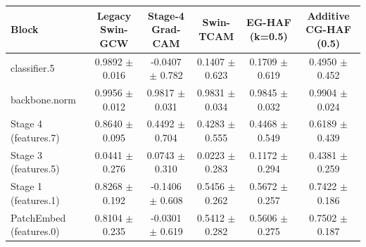 \begin{tabular}{lccccc}
\toprule
Block & Legacy Swin-GCW & Stage-4 Grad-CAM & Swin-TCAM & EG-HAF (k=0.5) & Additive CG-HAF (0.5) \\
\midrule
classifier.5 & 0.9892 $\pm$ 0.016 & -0.0407 $\pm$ 0.782 & 0.1407 $\pm$ 0.623 & 0.1709 $\pm$ 0.619 & 0.4950 $\pm$ 0.452 \\
backbone.norm & 0.9956 $\pm$ 0.012 & 0.9817 $\pm$ 0.031 & 0.9831 $\pm$ 0.034 & 0.9845 $\pm$ 0.032 & 0.9904 $\pm$ 0.024 \\
Stage 4 (features.7) & 0.8640 $\pm$ 0.095 & 0.4492 $\pm$ 0.704 & 0.4283 $\pm$ 0.555 & 0.4468 $\pm$ 0.549 & 0.6189 $\pm$ 0.439 \\
Stage 3 (features.5) & 0.0441 $\pm$ 0.276 & 0.0743 $\pm$ 0.310 & 0.0223 $\pm$ 0.283 & 0.1172 $\pm$ 0.294 & 0.4381 $\pm$ 0.259 \\
Stage 1 (features.1) & 0.8268 $\pm$ 0.192 & -0.1406 $\pm$ 0.608 & 0.5456 $\pm$ 0.262 & 0.5672 $\pm$ 0.257 & 0.7422 $\pm$ 0.186 \\
PatchEmbed (features.0) & 0.8104 $\pm$ 0.235 & -0.0301 $\pm$ 0.619 & 0.5412 $\pm$ 0.282 & 0.5606 $\pm$ 0.275 & 0.7502 $\pm$ 0.187 \\
\bottomrule
\end{tabular}
